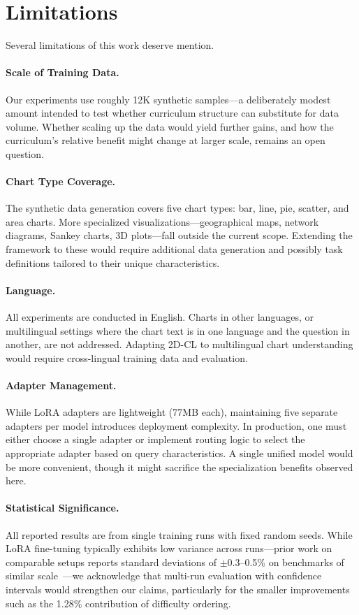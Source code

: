 ﻿\documentclass[journal]{IEEEtran}
\newcommand{\method}{2D-CL}
\begin{document}
\section*{Limitations}
Several limitations of this work deserve mention.

\paragraph{Scale of Training Data.}
Our experiments use roughly 12K synthetic samples---a deliberately modest amount intended to test whether curriculum structure can substitute for data volume. Whether scaling up the data would yield further gains, and how the curriculum's relative benefit might change at larger scale, remains an open question.

\paragraph{Chart Type Coverage.}
The synthetic data generation covers five chart types: bar, line, pie, scatter, and area charts. More specialized visualizations---geographical maps, network diagrams, Sankey charts, 3D plots---fall outside the current scope. Extending the framework to these would require additional data generation and possibly task definitions tailored to their unique characteristics.

\paragraph{Language.}
All experiments are conducted in English. Charts in other languages, or multilingual settings where the chart text is in one language and the question in another, are not addressed. Adapting \method{} to multilingual chart understanding would require cross-lingual training data and evaluation.

\paragraph{Adapter Management.}
While LoRA adapters are lightweight (77MB each), maintaining five separate adapters per model introduces deployment complexity. In production, one must either choose a single adapter or implement routing logic to select the appropriate adapter based on query characteristics. A single unified model would be more convenient, though it might sacrifice the specialization benefits observed here.

\paragraph{Statistical Significance.}
All reported results are from single training runs with fixed random seeds. While LoRA fine-tuning typically exhibits low variance across runs---prior work on comparable setups reports standard deviations of $\pm$0.3--0.5\% on benchmarks of similar scale~\cite{hu2022lora}---we acknowledge that multi-run evaluation with confidence intervals would strengthen our claims, particularly for the smaller improvements such as the 1.28\% contribution of difficulty ordering.
\end{document}
